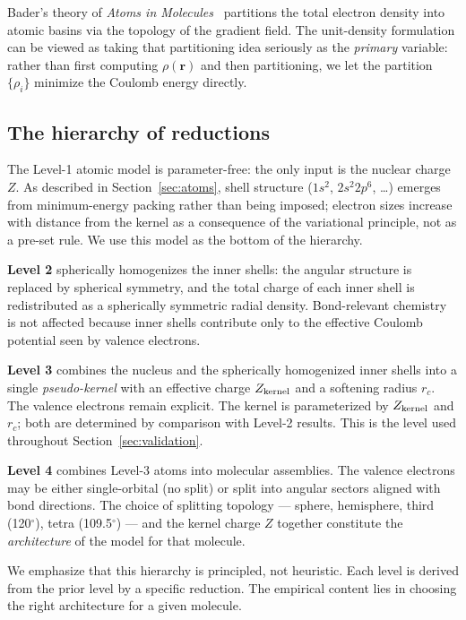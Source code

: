 \documentclass[11pt]{article}
\begin{document}
Bader's theory of \emph{Atoms in Molecules}~\cite{Bader90} partitions the total electron density into atomic basins via the topology of the gradient field. The unit-density formulation can be viewed as taking that partitioning idea seriously as the \emph{primary} variable: rather than first computing $\rho(\mathbf{r})$ and then partitioning, we let the partition $\{\rho_i\}$ minimize the Coulomb energy directly.

\subsection{The hierarchy of reductions}

The Level-1 atomic model is parameter-free: the only input is the nuclear charge $Z$. As described in Section~\ref{sec:atoms}, shell structure ($1s^2$, $2s^2 2p^6$, \ldots) emerges from minimum-energy packing rather than being imposed; electron sizes increase with distance from the kernel as a consequence of the variational principle, not as a pre-set rule. We use this model as the bottom of the hierarchy.

\textbf{Level 2} spherically homogenizes the inner shells: the angular structure is replaced by spherical symmetry, and the total charge of each inner shell is redistributed as a spherically symmetric radial density. Bond-relevant chemistry is not affected because inner shells contribute only to the effective Coulomb potential seen by valence electrons.

\textbf{Level 3} combines the nucleus and the spherically homogenized inner shells into a single \emph{pseudo-kernel} with an effective charge $Z_{\rm kernel}$ and a softening radius $r_c$. The valence electrons remain explicit. The kernel is parameterized by $Z_{\rm kernel}$ and $r_c$; both are determined by comparison with Level-2 results. This is the level used throughout Section~\ref{sec:validation}.

\textbf{Level 4} combines Level-3 atoms into molecular assemblies. The valence electrons may be either single-orbital (no split) or split into angular sectors aligned with bond directions. The choice of splitting topology --- sphere, hemisphere, third (120$^\circ$), tetra (109.5$^\circ$) --- and the kernel charge $Z$ together constitute the \emph{architecture} of the model for that molecule.

We emphasize that this hierarchy is principled, not heuristic. Each level is derived from the prior level by a specific reduction. The empirical content lies in choosing the right architecture for a given molecule.
\end{document}
